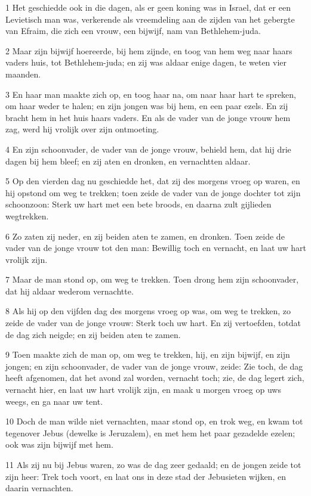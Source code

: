 \par 1 Het geschiedde ook in die dagen, als er geen koning was in Israel, dat er een Levietisch man was, verkerende als vreemdeling aan de zijden van het gebergte van Efraim, die zich een vrouw, een bijwijf, nam van Bethlehem-juda.
\par 2 Maar zijn bijwijf hoereerde, bij hem zijnde, en toog van hem weg naar haars vaders huis, tot Bethlehem-juda; en zij was aldaar enige dagen, te weten vier maanden.
\par 3 En haar man maakte zich op, en toog haar na, om naar haar hart te spreken, om haar weder te halen; en zijn jongen was bij hem, en een paar ezels. En zij bracht hem in het huis haars vaders. En als de vader van de jonge vrouw hem zag, werd hij vrolijk over zijn ontmoeting.
\par 4 En zijn schoonvader, de vader van de jonge vrouw, behield hem, dat hij drie dagen bij hem bleef; en zij aten en dronken, en vernachtten aldaar.
\par 5 Op den vierden dag nu geschiedde het, dat zij des morgens vroeg op waren, en hij opstond om weg te trekken; toen zeide de vader van de jonge dochter tot zijn schoonzoon: Sterk uw hart met een bete broods, en daarna zult gijlieden wegtrekken.
\par 6 Zo zaten zij neder, en zij beiden aten te zamen, en dronken. Toen zeide de vader van de jonge vrouw tot den man: Bewillig toch en vernacht, en laat uw hart vrolijk zijn.
\par 7 Maar de man stond op, om weg te trekken. Toen drong hem zijn schoonvader, dat hij aldaar wederom vernachtte.
\par 8 Als hij op den vijfden dag des morgens vroeg op was, om weg te trekken, zo zeide de vader van de jonge vrouw: Sterk toch uw hart. En zij vertoefden, totdat de dag zich neigde; en zij beiden aten te zamen.
\par 9 Toen maakte zich de man op, om weg te trekken, hij, en zijn bijwijf, en zijn jongen; en zijn schoonvader, de vader van de jonge vrouw, zeide: Zie toch, de dag heeft afgenomen, dat het avond zal worden, vernacht toch; zie, de dag legert zich, vernacht hier, en laat uw hart vrolijk zijn, en maak u morgen vroeg op uws weegs, en ga naar uw tent.
\par 10 Doch de man wilde niet vernachten, maar stond op, en trok weg, en kwam tot tegenover Jebus (dewelke is Jeruzalem), en met hem het paar gezadelde ezelen; ook was zijn bijwijf met hem.
\par 11 Als zij nu bij Jebus waren, zo was de dag zeer gedaald; en de jongen zeide tot zijn heer: Trek toch voort, en laat ons in deze stad der Jebusieten wijken, en daarin vernachten.
